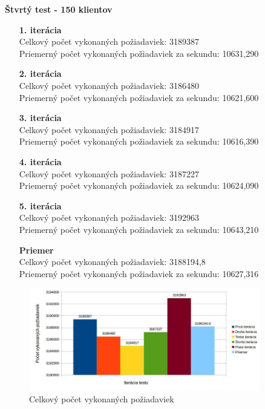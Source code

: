 \documentclass[12pt,oneside,final]{fithesis-utf8}
\begin{document}
\begin{itemize}
\textbf{Štvrtý test - 150 klientov}
\begin{itemize}

\item[\textbf{1. iterácia}]\ \\
Celkový počet vykonaných požiadaviek: 3189387\\
Priemerný počet vykonaných požiadaviek za sekundu: 10631,290

\item[\textbf{2. iterácia}]\ \\
Celkový počet vykonaných požiadaviek: 3186480\\
Priemerný počet vykonaných požiadaviek za sekundu: 10621,600

\item[\textbf{3. iterácia}]\ \\
Celkový počet vykonaných požiadaviek: 3184917\\
Priemerný počet vykonaných požiadaviek za sekundu: 10616,390

\item[\textbf{4. iterácia}]\ \\
Celkový počet vykonaných požiadaviek: 3187227\\
Priemerný počet vykonaných požiadaviek za sekundu: 10624,090

\item[\textbf{5. iterácia}]\ \\
Celkový počet vykonaných požiadaviek: 3192963\\
Priemerný počet vykonaných požiadaviek za sekundu: 10643,210

\item[\textbf{Priemer}]\ \\
Celkový počet vykonaných požiadaviek: 3188194,8\\
Priemerný počet vykonaných požiadaviek za sekundu: 10627,316

\end{itemize}

\begin{figure}[H]
  \centering
      \includegraphics[width=0.9\textwidth]{faban2_4.jpg}
  \caption{Celkový počet vykonaných požiadaviek}
\end{figure}


\end{itemize}
\end{document}
